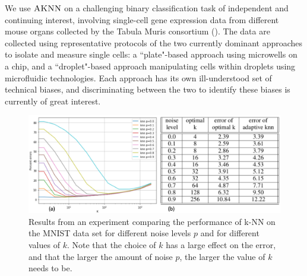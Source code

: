 \documentclass{article}
\newcommand{\algname}{\textsc{AKNN}}
\begin{document}
We use $\algname$ on a challenging binary classification task of independent and continuing interest, involving single-cell gene expression data from different mouse organs collected by the Tabula Muris consortium (\cite{tabulamuris18}). The data are collected using representative protocols of the two currently dominant approaches to isolate and measure single cells: a ``plate"-based approach using microwells on a chip, and a ``droplet"-based approach manipulating cells within droplets using microfluidic technologies. Each approach has its own ill-understood set of technical biases, and discriminating between the two to identify these biases is currently of great interest.

\begin{figure}
\begin{center}
\includegraphics[width=6in]{figs/combined_figure.png}
\end{center}
\caption{Results from an experiment comparing the performance of k-NN on the MNIST data set for different noise levels $p$ and for different values of $k$. Note that the choice of $k$ has a large effect on the error, and that the larger the amount of noise $p$, the larger the value of $k$ needs to be.}
\label{fig:mnist}
\end{figure}
\end{document}
